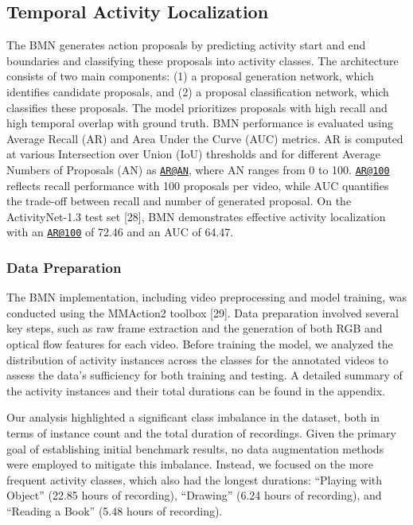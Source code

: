 \documentclass[
  man,floatsintext]{apa6}
\begin{document}
\subsection{Temporal Activity Localization}\label{temporal-activity-localization}

The BMN generates action proposals by predicting activity start and end boundaries and classifying these proposals into activity classes. The architecture consists of two main components: (1) a proposal generation network, which identifies candidate proposals, and (2) a proposal classification network, which classifies these proposals. The model prioritizes proposals with high recall and high temporal overlap with ground truth.
BMN performance is evaluated using Average Recall (AR) and Area Under the Curve (AUC) metrics. AR is computed at various Intersection over Union (IoU) thresholds and for different Average Numbers of Proposals (AN) as \href{mailto:AR@AN}{\nolinkurl{AR@AN}}, where AN ranges from 0 to 100. \href{mailto:AR@100}{\nolinkurl{AR@100}} reflects recall performance with 100 proposals per video, while AUC quantifies the trade-off between recall and number of generated proposal. On the ActivityNet-1.3 test set {[}28{]}, BMN demonstrates effective activity localization with an \href{mailto:AR@100}{\nolinkurl{AR@100}} of 72.46 and an AUC of 64.47.

\subsubsection{Data Preparation}\label{data-preparation}

The BMN implementation, including video preprocessing and model training, was conducted using the MMAction2 toolbox {[}29{]}. Data preparation involved several key steps, such as raw frame extraction and the generation of both RGB and optical flow features for each video. Before training the model, we analyzed the distribution of activity instances across the classes for the annotated videos to assess the data's sufficiency for both training and testing. A detailed summary of the activity instances and their total durations can be found in the appendix.

Our analysis highlighted a significant class imbalance in the dataset, both in terms of instance count and the total duration of recordings. Given the primary goal of establishing initial benchmark results, no data augmentation methods were employed to mitigate this imbalance. Instead, we focused on the more frequent activity classes, which also had the longest durations: ``Playing with Object'' (22.85 hours of recording), ``Drawing'' (6.24 hours of recording), and ``Reading a Book'' (5.48 hours of recording).
\end{document}
